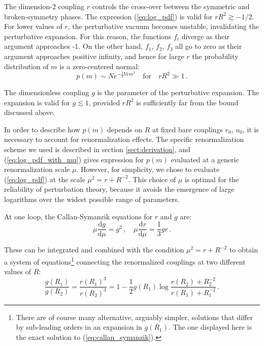 \documentclass[11pt,a4paper]{article}
\newcommand{\dd}{\mathrm{d}}
\begin{document}

The dimension-2 coupling $r$ controls the cross-over between the symmetric and
broken-symmetry phases. The expression (\ref{eq:log_pdf}) is valid for  $rR^2
\gtrsim -1/2$.  For lower values of $r$, the perturbative vacuum becomes
unstable, invalidating the perturbative expansion. For this reason, the
functions $f_i$ diverge as their argument approaches -1.  On the other hand,
$f_1$, $f_2$, $f_3$ all go to zero as their argument approaches positive
infinity, and hence for large $r$ the probability distribution of $m$ is a
zero-centered normal:
\begin{equation}
    p(m) \sim N e^{- \frac{1}{2} V r m^2}
  \quad \text{for} \quad
  rR^2 \gg 1\,.
\end{equation}

The dimensionless coupling $g$ is the parameter of the perturbative expansion.
The expansion is valid for $g \lesssim 1$, provided $rR^2$ is sufficiently far
from the bound discussed above.

In order to describe how $p(m)$ depends on $R$ at fixed bare couplings $r_0$,
$u_0$, it is necessary to account for renormalization effects. The specific
renormalization scheme we used is described in section \ref{sect:derivation},
and (\ref{eq:log_pdf_with_mu}) gives expression for $p(m)$ evaluated at a
generic renormalization scale $\mu$. However, for simplicity, we chose to
evaluate (\ref{eq:log_pdf}) at the scale $\mu^2 = r + R^{-2}$.  This choice of
$\mu$ is optimal for the reliability of perturbation theory, because it avoids
the emergence of large logarithms over the widest possible range of parameters.

At one loop, the Callan-Symanzik equations for $r$ and $g$ are:
\begin{equation}
  \label{eq:callan_symanzik}
  \mu \frac{\dd g}{\dd \mu} = g^2\,,\quad
  \mu \frac{\dd r}{\dd \mu} = \frac{1}{3}g r\,.
\end{equation}

These can be integrated and combined with the condition $\mu^2 = r + R^{-2}$ to
obtain a system of equations\footnote{There are of course many alternative,
arguably simpler, solutions that differ by sub-leading orders in an expansion in
$g(R_1)$. The one displayed here is the exact solution to
(\ref{eq:callan_symanzik}).} connecting the renormalized couplings at two
different values of $R$:
\begin{equation}
  \label{eq:renormalized_relation}
  \frac{g(R_1)}{g(R_2)} = \frac{r(R_1)^3}{r(R_2)^3} = 
  1 - \frac{1}{2} g(R_1)\log\frac{r(R_2) + R_2^{-2}}{r(R_1) + R_1^{-2}}\,.
\end{equation}
\end{document}
